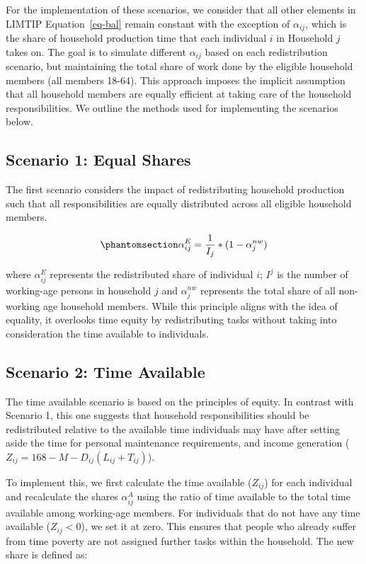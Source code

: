 \documentclass[
  11pt,
]{article}
\begin{document}
For the implementation of these scenarios, we consider that all other
elements in LIMTIP Equation~\ref{eq-bal} remain constant with the
exception of \(\alpha_{ij}\), which is the share of household production
time that each individual \(i\) in Household \(j\) takes on. The goal is
to simulate different \(\alpha_{ij}\) based on each redistribution
scenario, but maintaining the total share of work done by the eligible
household members (all members 18-64). This approach imposes the
implicit assumption that all household members are equally efficient at
taking care of the household responsibilities. We outline the methods
used for implementing the scenarios below.

\subsection{Scenario 1: Equal Shares}\label{scenario-1-equal-shares}

The first scenario considers the impact of redistributing household
production such that all responsibilities are equally distributed across
all eligible household members.

\begin{equation}\phantomsection\label{eq-r1}{\alpha_{ij}^E= \frac{1}{I_j}*(1-\alpha_{j}^{nw})
}\end{equation}

where \(\alpha_{ij}^E\) represents the redistributed share of individual
\(i\); \(I^j\) is the number of working-age persons in household \(j\)
and \(\alpha_{j}^{nw}\) represents the total share of all non-working
age household members. While this principle aligns with the idea of
equality, it overlooks time equity by redistributing tasks without
taking into consideration the time available to individuals.

\subsection{Scenario 2: Time Available}\label{scenario-2-time-available}

The time available scenario is based on the principles of equity. In
contrast with Scenario 1, this one suggests that household
responsibilities should be redistributed relative to the available time
individuals may have after setting aside the time for personal
maintenance requirements, and income generation
(\(Z_{ij}=168-M-D_{ij}(L_{ij}+T_{ij})\)).

To implement this, we first calculate the time available (\(Z_{ij}\))
for each individual and recalculate the shares \(\alpha_{ij}^A\) using
the ratio of time available to the total time available among
working-age members. For individuals that do not have any time available
(\(Z_{ij}<0\)), we set it at zero. This ensures that people who already
suffer from time poverty are not assigned further tasks within the
household. The new share is defined as:
\end{document}
